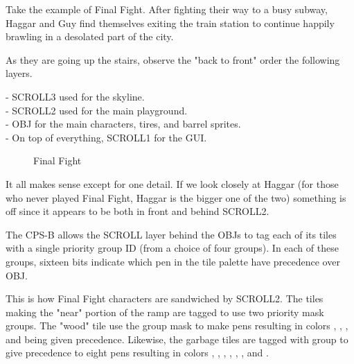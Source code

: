 Take the example of Final Fight. After fighting their way to a busy subway, Haggar and Guy find themselves exiting the train station to continue happily brawling in a desolated part of the city. 

As they are going up the stairs, observe the "back to front" order the following layers.

-  SCROLL3 used for the skyline.\\
-  SCROLL2 used for the main playground.\\
-  OBJ for the main characters, tires, and barrel sprites.\\
-  On top of everything, SCROLL1 for the GUI.


\vfill
\begin{figure}[!b]
 \caption*{Final Fight}%
 \end{figure}%
\pagebreak


It all makes sense except for one detail. If we look closely at Haggar (for those who never played Final Fight, Haggar is the bigger one of the two) something is off since it appears to be both in front and behind SCROLL2.

The CPS-B allows the SCROLL layer behind the OBJs to tag each of its tiles with a single priority group ID (from a choice of four groups). In each of these groups, sixteen bits indicate which pen in the tile palette have precedence over OBJ.

This is how Final Fight characters are sandwiched by SCROLL2. The tiles making the "near" portion of the ramp are tagged to use two priority mask groups. The "wood" tile use the group mask  to make pens resulting in colors
 , 
 , 
 , and 
 being given precedence. 
Likewise, the garbage tiles are tagged with group  to give precedence to eight pens resulting in colors 
  , 
 , 
 , 
 , 
 ,
 , 
 and  
.

